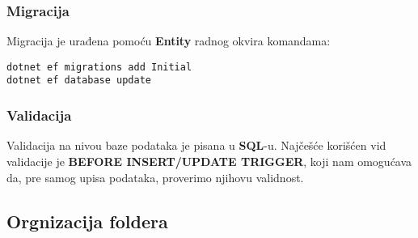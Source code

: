 \subsubsection*{Migracija}
\par Migracija je urađena pomoću \textbf{Entity} radnog okvira komandama:
\begin{lstlisting}[caption=b, captionpos=b]
dotnet ef migrations add Initial
dotnet ef database update
\end{lstlisting}
\subsubsection*{Validacija}
\par Validacija na nivou baze podataka je pisana u \textbf{SQL}-u. Najčešće korišćen
vid validacije je \textbf{BEFORE INSERT/UPDATE TRIGGER}, koji nam omogućava da, pre samog upisa podataka, proverimo njihovu validnost.
\subsection{Orgnizacija foldera}